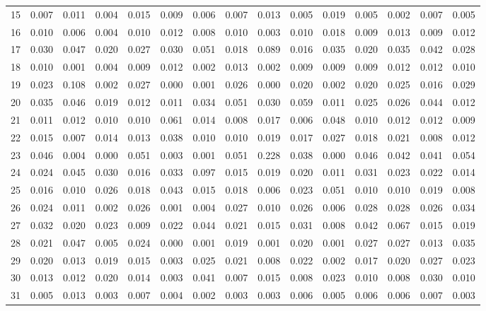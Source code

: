 \begin{table}[ht]
\begin{tabular}{lrrrrrrrrrrrrrr}
  15 & 0.007 & 0.011 & 0.004 & 0.015 & 0.009 & 0.006 & 0.007 & 0.013 & 0.005 & 0.019 & 0.005 & 0.002 & 0.007 & 0.005 \\ 
  16 & 0.010 & 0.006 & 0.004 & 0.010 & 0.012 & 0.008 & 0.010 & 0.003 & 0.010 & 0.018 & 0.009 & 0.013 & 0.009 & 0.012 \\ 
  17 & 0.030 & 0.047 & 0.020 & 0.027 & 0.030 & 0.051 & 0.018 & 0.089 & 0.016 & 0.035 & 0.020 & 0.035 & 0.042 & 0.028 \\ 
  18 & 0.010 & 0.001 & 0.004 & 0.009 & 0.012 & 0.002 & 0.013 & 0.002 & 0.009 & 0.009 & 0.009 & 0.012 & 0.012 & 0.010 \\ 
  19 & 0.023 & 0.108 & 0.002 & 0.027 & 0.000 & 0.001 & 0.026 & 0.000 & 0.020 & 0.002 & 0.020 & 0.025 & 0.016 & 0.029 \\ 
  20 & 0.035 & 0.046 & 0.019 & 0.012 & 0.011 & 0.034 & 0.051 & 0.030 & 0.059 & 0.011 & 0.025 & 0.026 & 0.044 & 0.012 \\ 
  21 & 0.011 & 0.012 & 0.010 & 0.010 & 0.061 & 0.014 & 0.008 & 0.017 & 0.006 & 0.048 & 0.010 & 0.012 & 0.012 & 0.009 \\ 
  22 & 0.015 & 0.007 & 0.014 & 0.013 & 0.038 & 0.010 & 0.010 & 0.019 & 0.017 & 0.027 & 0.018 & 0.021 & 0.008 & 0.012 \\ 
  23 & 0.046 & 0.004 & 0.000 & 0.051 & 0.003 & 0.001 & 0.051 & 0.228 & 0.038 & 0.000 & 0.046 & 0.042 & 0.041 & 0.054 \\ 
  24 & 0.024 & 0.045 & 0.030 & 0.016 & 0.033 & 0.097 & 0.015 & 0.019 & 0.020 & 0.011 & 0.031 & 0.023 & 0.022 & 0.014 \\ 
  25 & 0.016 & 0.010 & 0.026 & 0.018 & 0.043 & 0.015 & 0.018 & 0.006 & 0.023 & 0.051 & 0.010 & 0.010 & 0.019 & 0.008 \\ 
  26 & 0.024 & 0.011 & 0.002 & 0.026 & 0.001 & 0.004 & 0.027 & 0.010 & 0.026 & 0.006 & 0.028 & 0.028 & 0.026 & 0.034 \\ 
  27 & 0.032 & 0.020 & 0.023 & 0.009 & 0.022 & 0.044 & 0.021 & 0.015 & 0.031 & 0.008 & 0.042 & 0.067 & 0.015 & 0.019 \\ 
  28 & 0.021 & 0.047 & 0.005 & 0.024 & 0.000 & 0.001 & 0.019 & 0.001 & 0.020 & 0.001 & 0.027 & 0.027 & 0.013 & 0.035 \\ 
  29 & 0.020 & 0.013 & 0.019 & 0.015 & 0.003 & 0.025 & 0.021 & 0.008 & 0.022 & 0.002 & 0.017 & 0.020 & 0.027 & 0.023 \\ 
  30 & 0.013 & 0.012 & 0.020 & 0.014 & 0.003 & 0.041 & 0.007 & 0.015 & 0.008 & 0.023 & 0.010 & 0.008 & 0.030 & 0.010 \\ 
  31 & 0.005 & 0.013 & 0.003 & 0.007 & 0.004 & 0.002 & 0.003 & 0.003 & 0.006 & 0.005 & 0.006 & 0.006 & 0.007 & 0.003 \\ 

\end{tabular}
\end{table}
